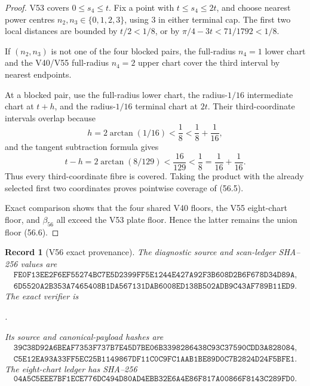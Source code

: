 \documentclass[11pt,oneside]{article}
\newtheorem{record}[theorem]{Record}
\theoremstyle{definition}
\theoremstyle{remark}
\begin{document}
\begin{proof}
V53 covers \(0\le s_4\le t\).  Fix a point with
\(t\le s_4\le2t\), and choose nearest power centres
\(n_2,n_3\in\{0,1,2,3\}\), using \(3\) in either terminal cap.
The first two local distances are bounded by \(t/2<1/8\), or by
\(\pi/4-3t<71/1792<1/8\).

If \((n_2,n_3)\) is not one of the four blocked pairs, the
full-radius \(n_4=1\) lower chart and the V40/V55 full-radius
\(n_4=2\) upper chart cover the third interval by nearest
endpoints.

At a blocked pair, use the full-radius lower chart, the
radius-\(1/16\) intermediate chart at \(t+h\), and the
radius-\(1/16\) terminal chart at \(2t\).  Their third-coordinate
intervals overlap because
\[
 h=2\arctan(1/16)<\frac18<\frac18+\frac1{16},         \tag{56.7}
\]
and the tangent subtraction formula gives
\[
 t-h=2\arctan(8/129)
 <\frac{16}{129}<\frac18=\frac1{16}+\frac1{16}.       \tag{56.8}
\]
Thus every third-coordinate fibre is covered.  Taking the product
with the already selected first two coordinates proves pointwise
coverage of (56.5).

Exact comparison shows that the four shared V40 floors, the V55
eight-chart floor, and \(\beta_{56}\) all exceed the V53 plate
floor.  Hence the latter remains the union floor (56.6).
\end{proof}

\begin{record}[V56 exact provenance]
\label{rec:newv56-provenance}
The diagnostic source and scan-ledger SHA--256 values are
\[
\begin{gathered}
\texttt{FE0F13EE2F6EF55274BC7E5D2399FF5E1244E427A92F3B608D2B6F678D34D89A},\\
\texttt{6D5520A2B353A7465408B1DA567131DAB6008ED138B502ADB9C43AF789B11ED9}.
\end{gathered}                                         \tag{56.9}
\]
The exact verifier is
\begin{center}
\footnotesize
{}.
\end{center}
Its source and canonical-payload hashes are
\[
\begin{gathered}
\texttt{39C38D92A6BEAF7353F737B7E45D7BE06B3398286438C93C37590CDD3A828084},\\
\texttt{C5E12EA93A33FF5EC25B1149867DF11C0C9FC1AAB1BE89D0C7B2824D24F5BFE1}.
\end{gathered}                                         \tag{56.10}
\]
The eight-chart ledger has SHA--256
\[
\texttt{04A5C5EEE7BF1ECE776DC494D80AD4EBB32E6A4E86F817A00866F8143C289FD0}.
                                                               \tag{56.11}
\]
\end{record}
\end{document}
